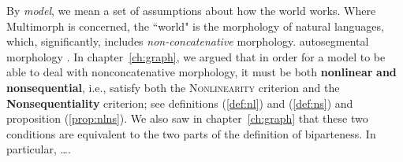 
By \emph{model}, 
we mean a set of assumptions about how the world works. Where Multimorph is concerned, 
the ``world" is the morphology of natural languages, which, significantly, includes \emph{non-concatenative} morphology. 
autosegmental morphology \citep{mccarthy:1981}. 
In chapter~\ref{ch:graph}, we argued
that in order
for a model to be able to deal with nonconcatenative morphology,
 it must be both \textbf{nonlinear} \textbf{and}
 \textbf{nonsequential},
 i.e., satisfy both the \textsc{Nonlinearity} criterion and the \textbf{Nonsequentiality} criterion; 
 see definitions (\ref{def:nl}) and (\ref{def:ns}) and 
 proposition (\ref{prop:nlns}). We also saw in chapter~\ref{ch:graph} that these two conditions are equivalent to the two parts of the definition of biparteness. In particular, \dots.
 
 
